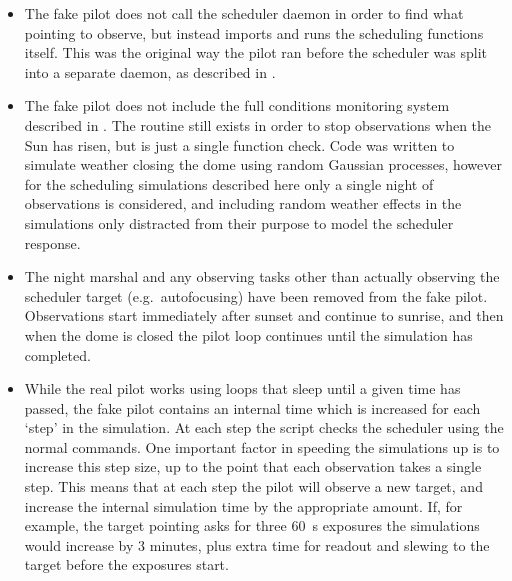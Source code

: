 \begin{colsection}
\begin{itemize}
    \item The fake pilot does not call the scheduler daemon in order to find what pointing to observe, but instead imports and runs the scheduling functions itself. This was the original way the pilot ran before the scheduler was split into a separate daemon, as described in .
    \item The fake pilot does not include the full conditions monitoring system described in . The  routine still exists in order to stop observations when the Sun has risen, but is just a single function check. Code was written to simulate weather closing the dome using random Gaussian processes, however for the scheduling simulations described here only a single night of observations is considered, and including random weather effects in the simulations only distracted from their purpose to model the scheduler response.
    \item The night marshal and any observing tasks other than actually observing the scheduler target (e.g.\ autofocusing) have been removed from the fake pilot. Observations start immediately after sunset and continue to sunrise, and then when the dome is closed the pilot loop continues until the simulation has completed.
    \item While the real pilot works using loops that sleep until a given time has passed, the fake pilot contains an internal time which is increased for each `step' in the simulation. At each step the script checks the scheduler using the normal commands. One important factor in speeding the simulations up is to increase this step size, up to the point that each observation takes a single step. This means that at each step the pilot will observe a new target, and increase the internal simulation time by the appropriate amount. If, for example, the target pointing asks for three \SI{60}{\second} exposures the simulations would increase by 3 minutes, plus extra time for readout and slewing to the target before the exposures start.
\end{itemize}

\newpage

\end{colsection}


